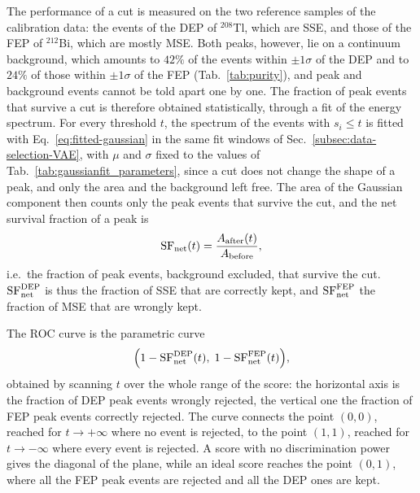 The performance of a cut is measured on the two reference samples of the calibration data: the events of the \ac{DEP} of $^{208}$Tl, which are \ac{SSE}, and those of the \ac{FEP} of $^{212}$Bi, which are mostly \ac{MSE}. Both peaks, however, lie on a continuum background, which amounts to $42\%$ of the events within $\pm1\sigma$ of the \ac{DEP} and to $24\%$ of those within $\pm1\sigma$ of the \ac{FEP} (Tab.~\ref{tab:purity}), and peak and background events cannot be told apart one by one. The fraction of peak events that survive a cut is therefore obtained statistically, through a fit of the energy spectrum. For every threshold $t$, the spectrum of the events with $s_i \leq t$ is fitted with Eq.~\ref{eq:fitted-gaussian} in the same fit windows of Sec.~\ref{subsec:data-selection-VAE}, with $\mu$ and $\sigma$ fixed to the values of Tab.~\ref{tab:gaussianfit_parameters}, since a cut does not change the shape of a peak, and only the area and the background left free. The area of the Gaussian component then counts only the peak events that survive the cut, and the net survival fraction of a peak is
\begin{equation}
    \mathrm{SF}_{\rm net}(t) = \frac{A_{\rm after}(t)}{A_{\rm before}},
    \label{eq:sf_net}
\end{equation}
i.e.\ the fraction of peak events, background excluded, that survive the cut. $\mathrm{SF}^{\rm DEP}_{\rm net}$ is thus the fraction of \ac{SSE} that are correctly kept, and $\mathrm{SF}^{\rm FEP}_{\rm net}$ the fraction of \ac{MSE} that are wrongly kept.

The \ac{ROC} curve is the parametric curve
\begin{equation}
    \Big(1 - \mathrm{SF}^{\rm DEP}_{\rm net}(t),\; 1 - \mathrm{SF}^{\rm FEP}_{\rm net}(t)\Big),
    \label{eq:roc_net}
\end{equation}
obtained by scanning $t$ over the whole range of the score: the horizontal axis is the fraction of \ac{DEP} peak events wrongly rejected, the vertical one the fraction of \ac{FEP} peak events correctly rejected. The curve connects the point $(0,0)$, reached for $t \to +\infty$ where no event is rejected, to the point $(1,1)$, reached for $t \to -\infty$ where every event is rejected. A score with no discrimination power gives the diagonal of the plane, while an ideal score reaches the point $(0,1)$, where all the \ac{FEP} peak events are rejected and all the \ac{DEP} ones are kept.

